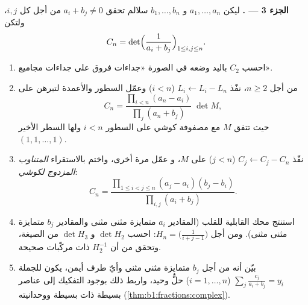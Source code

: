 \begin{problem}
\medskip
\noindent\textbf{الجزء 3 --- .} ليكن $a_1,
\dots, a_n$ و $b_1, \dots, b_n$ سلالم تحقق $a_i + b_j
\neq 0$ من أجل كل $i, j$، ولتكن
\[
C_n = \det\Bigl(\frac{1}{a_i + b_j}\Bigr)_{1 \leq i, j \leq n} .
\]
\begin{enumerate}[resume]
  \item احسب $C_2$ باليد وضعه في الصورة
        «جداءات فروق على جداءات مجاميع».
  \item من أجل $n \geq 2$، نفّذ $L_i \leftarrow L_i - L_n$ ($i <
        n$) وعمّل السطور والأعمدة لتبرهن على
        \[
        C_n = \frac{\prod_{i<n}(a_n - a_i)}{\prod_{j}(a_n +
        b_j)}\;\det M,
        \]
        حيث تتفق $M$ مع مصفوفة كوشي على السطور $i < n$
        ولها السطر الأخير $(1, 1, \dots, 1)$.
  \item نفّذ $C_j \leftarrow C_j - C_n$ ($j < n$) على $M$، و
        عمّل مرة أخرى، واختم بالاستقراء
        \emph{المتناوب المزدوج لكوشي}:
        \[
        C_n = \frac{\prod_{1 \leq i < j \leq n}(a_j - a_i)(b_j -
        b_i)}{\prod_{i, j}(a_i + b_j)} .
        \]
  \item استنتج محك القابلية للقلب (المقادير $a_i$ متمايزة مثنى
        مثنى والمقادير $b_j$ متمايزة مثنى مثنى). ومن أجل
        \emph{} $H_n = \bigl(\frac{1}{i + j -
        1}\bigr)$: احسب $\det H_2$ و $\det H_3$ من
        الصيغة، وتحقق من أن $H_2^{-1}$ ذات مركّبات صحيحة.
  \item بيّن أنه من أجل $b_j$ متمايزة مثنى مثنى وأيّ طرف
        أيمن، يكون للجملة $\sum_j \frac{c_j}{a_i + b_j} = y_i$
        ($i = 1, \dots, n$) حلٌّ وحيد، واربط
        ذلك بوجود التفكيك إلى عناصر بسيطة ذات  بسيطة
        ووحدانيته
        (\cref{thm:b1:fractions:complex}).
\end{enumerate}


\end{problem}
